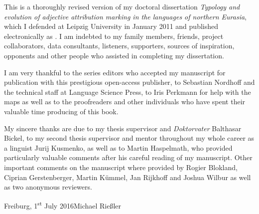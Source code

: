 

This is a thoroughly revised version of my doctoral dissertation \textit{Typology and evolution of adjective attribution marking in the languages of northern Eurasia}, which I defended at Leipzig University in January 2011 and published electronically as \citet{riesler2011a}. I am indebted to my family members, friends, project collaborators, data consultants, listeners, supporters, sources of inspiration, opponents and other people who assisted in completing my dissertation. 

I am very thankful to the series editors who accepted my manuscript for publication with this prestigious open-access publisher, to Sebastian Nordhoff and the technical staff at Language Science Press, to Iris Perkmann for help with the maps as well as to the proofreaders and other individuals who have spent their valuable time producing of this book. 

My sincere thanks are due to my thesis supervisor and \emph{Doktorvater} Balthasar Bickel, to my second thesis supervisor and mentor throughout my whole career as a linguist Jurij Kusmenko, as well as to Martin Haspelmath, who provided particularly valuable comments after his careful reading of my manuscript. Other important comments on the manuscript where provided by Rogier Blokland, Ciprian Gerstenberger, Martin Kümmel, Jan Rijkhoff and Joshua Wilbur as well as two anonymous reviewers.

\bigskip

\noindent
Freiburg, 1\textsuperscript{st} July 2016\hfill Michael Rießler
